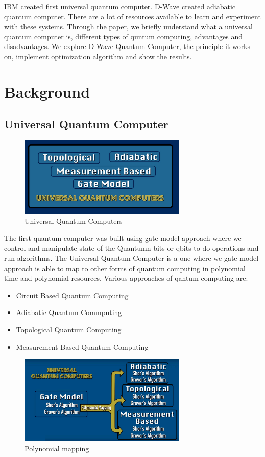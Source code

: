 \documentclass[12pt,conference]{IEEEtran}
\begin{document}
IBM created first universal quantum computer. D-Wave created adiabatic quantum computer.\cite{3} There are a lot of resources available to learn and experiment with these systems. Through the paper, we briefly understand what a universal quantum computer is, different types of quntum computing, advantages and disadvantages. We explore D-Wave Quantum Computer, the principle it works on, implement optimization algorithm and show the results. 


\section{Background}

\subsection{Universal Quantum Computer}

\begin{figure}[h]
  \centering
  \includegraphics[width=8cm]{uqc.png}
  \caption{Universal Quantum Computers}
  \label{fig:UniversalQC}
\end{figure}

The first quantum computer was built using gate model approach where we control and manipulate state of the Quantumn bits or qbits to do operations and run algorithms. The Universal Quantum Computer is a one where we gate model approach is able to map to other forms of quantum computing in polynomial time and polynomial resources. Various approaches of qantum computing are\cite{4}:
\begin{itemize}
  \item Circuit Based Quantum Computing
  \item Adiabatic Quantum Commputing
  \item Topological Quantum Computing
  \item Measurement Based Quantum Computing
\end{itemize}

\begin{figure}[h]
  \centering
  \includegraphics[width=8cm]{uqc_mapping.jpg}
  \caption{Polynomial mapping}
  \label{fig:PolynomicalUQC}
\end{figure}
\end{document}
